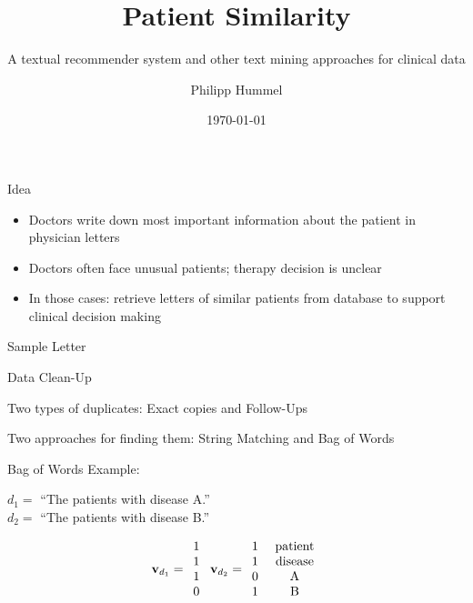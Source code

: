 \documentclass[10pt]{beamer}
\title{Patient Similarity}
\subtitle{A textual recommender system and other text mining approaches for clinical data}
\date{\today}
\author{Philipp Hummel}
\begin{document}
\maketitle

\begin{frame}{Idea}
	\begin{itemize}
		\item Doctors write down most important information about the patient in physician letters
		\item Doctors often face unusual patients; therapy decision is unclear
		\item In those cases: retrieve letters of similar patients from database to support clinical decision making
	\end{itemize}
\end{frame}


\begin{frame}[fragile]{Sample Letter}

  
\end{frame}


\begin{frame}{Data Clean-Up}

Two types of duplicates: Exact copies and Follow-Ups

Two approaches for finding them: String Matching and Bag of Words

\bigskip

Bag of Words Example:

$d_{1}=$ ``The patients with disease A.'' \\ $d_{2}=$ ``The patients with disease B.''

\[
\textbf{v}_{d_1}=\begin{array}{c}
1\\
1\\
1\\
0
\end{array}\ \textbf{v}_{d_2}=\begin{array}{c}
1\\
1\\
0\\
1
\end{array}\ \begin{array}{c}
\rm{patient}\\
\rm{disease}\\
\rm{A}\\
\rm{B}\\
\end{array}
\]


\end{frame}
\end{document}
